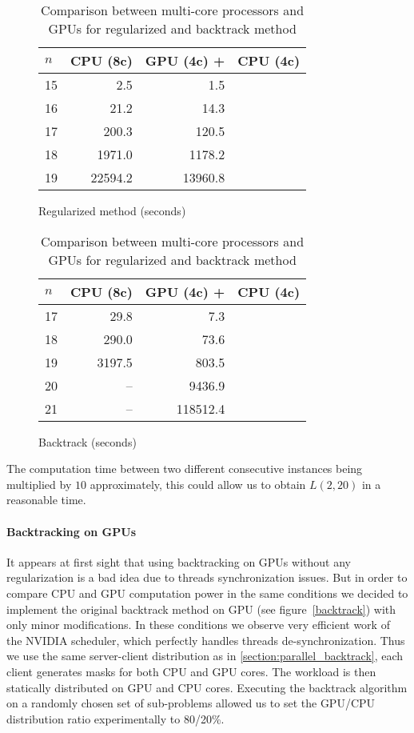 \begin{table}[t!]
\begin{subfigure}[b]{0.5\linewidth}
\centering
\begin{tabular}{l r r r}
					\hline
					$n$ & CPU (8c) &  GPU (4c) +  &  \hspace*{-.8em}CPU (4c) \\
					\hline
					\hline
					15	& 2.5 & 1.5 & \\
					16  & 21.2 &14.3 & \\
					17  & 200.3 &120.5 &\\
					18  & 1971.0 &1178.2 &\\
					19  & 22594.2 & 13960.8 & \\ 
					\hline
\end{tabular}
\caption{Regularized method (seconds)}
\label{tab:result_base_regu}
\end{subfigure}
\begin{subfigure}[b]{0.5\linewidth}
\centering
\begin{tabular}{ l r r r }
					\hline
					$n$ & CPU (8c) &  GPU (4c) +  &  \hspace*{-.8em}CPU (4c) \\
					\hline
					\hline
					17  & 29.8 & 7.3&\\
					18  & 290.0 & 73.6&\\
					19  & 3197.5 & 803.5& \\
					20  & -- & 9436.9 &\\
					21  & -- & 118512.4& \\ 
					\hline
\end{tabular}	
\caption{Backtrack  (seconds)}
\label{tab:result_backtrack}
\end{subfigure}
\caption{Comparison between multi-core processors and GPUs for regularized and backtrack method}
\end{table}

The computation time between two different consecutive instances being multiplied by $10$ approximately, this could allow us to obtain $L(2,20)$ in a reasonable time.


\paragraph{Backtracking on GPUs}

It appears at first sight that using backtracking on GPUs without any regularization is a bad idea due to threads synchronization issues.
But in order to compare CPU and GPU computation power in the same conditions we decided to implement the original backtrack method on GPU (see figure~\ref{backtrack}) with only minor modifications.
In these conditions we observe very efficient work of the NVIDIA scheduler, which perfectly handles threads de-synchronization.
Thus we use the same server-client distribution as in \ref{section:parallel_backtrack}, each client generates masks for both CPU and GPU cores. 
The workload is then statically distributed on GPU and CPU cores.
Executing the backtrack algorithm on a randomly chosen set of sub-problems allowed us to set the GPU/CPU distribution ratio experimentally to 80/20\%.

